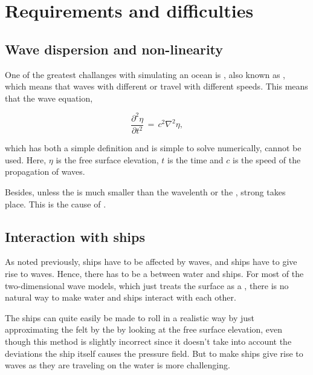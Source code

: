 \chapter{Requirements and difficulties}

\section{Wave dispersion and non-linearity}

One of the greatest challanges with simulating an ocean is , also known as , which means that waves with different \wavelengths or \frequencies travel with different speeds. This means that the wave equation,

\begin{equation} \label{eq:wave_equation}
\frac{\partial^2 \eta}{\partial t^2} \,=\, c^2\nabla^2\eta,
\end{equation}

which has both a simple definition and is simple to solve numerically, cannot be used. Here, $\eta$ is the free surface elevation, $t$ is the time and $c$ is the speed of the propagation of waves.

Besides, unless the  is much smaller than the wavelenth or the , strong  takes place. This is the cause of .

\section{Interaction with ships}

As noted previously, ships have to be affected by waves, and ships have to give rise to waves. Hence, there has to be a  between water and ships. For most of the two-dimensional wave models, which just treats the surface as a , there is no natural way to make water and ships interact with each other.

The ships can quite easily be made to roll in a realistic way by just approximating the  felt by the  by looking at the free surface elevation, even though this method is slightly incorrect since it doesn't take into account the deviations the ship itself causes the pressure field. But to make ships give rise to waves as they are traveling on the water is more challenging.

